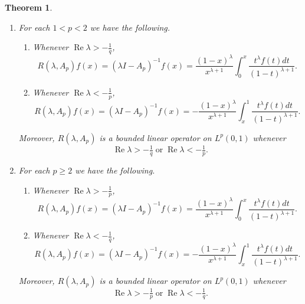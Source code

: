 \documentclass[11pt]{amsart}
\numberwithin{equation}{section}
\theoremstyle{plain}
\newtheorem{Theorem}[equation]{Theorem}
\theoremstyle{definition}
\renewcommand{\geq}{\geqslant}
\renewcommand{\Re}[1]{\operatorname{Re} #1 }
\newcommand{\0}{{\color{lightgray}0}}
\begin{document}
\begin{Theorem}\label{rrrrAAp}
\hfill
\begin{enumerate}
\item For each $1 < p < 2$ we have the following.
\begin{enumerate}
\item Whenever $\Re \lambda> -\frac{1}{q}$,
\begin{equation}\label{aone}
 R(\lambda,A_p)f(x)=(\lambda I-A_p)^{-1}f(x)=\frac{(1-x)^{\lambda}}{x^{\lambda+1}}\int_{0}^{x}\frac{t^{\lambda}f(t)dt}{(1-t)^{\lambda+1}}.
 \end{equation}
\item Whenever $\Re \lambda<-\frac{1}{p}$,
\begin{equation}\label{atwo}
 R(\lambda,A_p)f(x)=(\lambda I-A_p)^{-1}f(x)=-\frac{(1-x)^{\lambda}}{x^{\lambda+1}}\int_{x}^{1}\frac{t^{\lambda}f(t)dt}{(1-t)^{\lambda+1}}.
 \end{equation}
  \end{enumerate}
 Moreover, $R(\lambda,A_p)$ is a bounded linear operator on $L^{p}(0,1)$ whenever 
$$ \Re \lambda > -\tfrac{1}{q} \; \mbox{or} \; \Re \lambda < -\tfrac{1}{p}.$$
\item For each  $p \geq 2$ we have the following.
\begin{enumerate}
\item Whenever $\Re \lambda > -\frac{1}{p}$, 
\begin{equation}\label{bone}
 R(\lambda,A_p)f(x)=(\lambda I-A_p)^{-1}f(x)=\frac{(1-x)^{\lambda}}{x^{\lambda+1}}\int_{0}^{x}\frac{t^{\lambda}f(t)dt}{(1-t)^{\lambda+1}}.
 \end{equation}
 \item Whenever $\Re \lambda < -\frac{1}{q}$, 
 \begin{equation}\label{btwo}
  R(\lambda,A_p)f(x)=(\lambda I-A_p)^{-1}f(x)=-\frac{(1-x)^{\lambda}}{x^{\lambda+1}}\int_{x}^{1}\frac{t^{\lambda}f(t)dt}{(1-t)^{\lambda+1}}.
  \end{equation}
\end{enumerate}
   Moreover, $R(\lambda,A_p)$ is a bounded linear operator on $L^{p}(0,1)$ whenever 
$$\Re \lambda > -\tfrac{1}{p} \; \mbox{or} \; \Re \lambda < -\tfrac{1}{q}.$$
\end{enumerate}
\end{Theorem}
\end{document}
